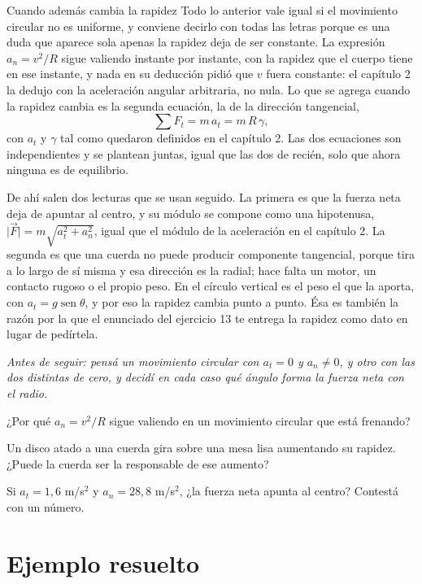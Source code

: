 \documentclass[11pt,openany]{book}
\newcommand{\sen}{\operatorname{sen}}
\begin{document}
\begin{bloque}{Cuando además cambia la rapidez}
Todo lo anterior vale igual si el movimiento circular no es uniforme, y conviene decirlo con todas las letras porque es una duda que aparece sola apenas la rapidez deja de ser constante. La expresión $a_n = v^2/R$ sigue valiendo instante por instante, con la rapidez que el cuerpo tiene en ese instante, y nada en su deducción pidió que $v$ fuera constante: el capítulo 2 la dedujo con la aceleración angular arbitraria, no nula. Lo que se agrega cuando la rapidez cambia es la segunda ecuación, la de la dirección tangencial,
\[
\sum F_t = m\,a_t = m\,R\,\gamma ,
\]
con $a_t$ y $\gamma$ tal como quedaron definidos en el capítulo 2. Las dos ecuaciones son independientes y se plantean juntas, igual que las dos de recién, solo que ahora ninguna es de equilibrio.

De ahí salen dos lecturas que se usan seguido. La primera es que la fuerza neta deja de apuntar al centro, y su módulo se compone como una hipotenusa, $\lvert\vec F\rvert = m\sqrt{a_t^2 + a_n^2}$, igual que el módulo de la aceleración en el capítulo 2. La segunda es que una cuerda no puede producir componente tangencial, porque tira a lo largo de sí misma y esa dirección es la radial; hace falta un motor, un contacto rugoso o el propio peso. En el círculo vertical es el peso el que la aporta, con $a_t = g\sen\theta$, y por eso la rapidez cambia punto a punto. Ésa es también la razón por la que el enunciado del ejercicio 13 te entrega la rapidez como dato en lugar de pedírtela.

\textit{Antes de seguir: pensá un movimiento circular con $a_t = 0$ y $a_n \neq 0$, y otro con las dos distintas de cero, y decidí en cada caso qué ángulo forma la fuerza neta con el radio.}
\end{bloque}

\begin{chequeo}
\item ¿Por qué $a_n = v^2/R$ sigue valiendo en un movimiento circular que está frenando?
\item Un disco atado a una cuerda gira sobre una mesa lisa aumentando su rapidez. ¿Puede la cuerda ser la responsable de ese aumento?
\item Si $a_t = 1{,}6$ m/s$^2$ y $a_n = 28{,}8$ m/s$^2$, ¿la fuerza neta apunta al centro? Contestá con un número.
\end{chequeo}

\section{Ejemplo resuelto}
\end{document}

